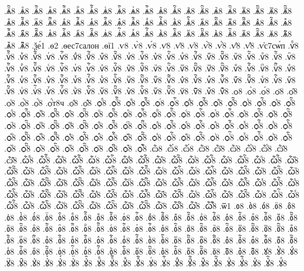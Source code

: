 {.ѧⷩ҇8
.ѧⷪ8
.ѧⷪ҇8
.ѧⷫ8
.ѧⷫ҇8
.ѧⷬ8
.ѧⷬ҇8
.ѧⷭ8
.ѧⷭ҇8
.ѧⷮ8
.ѧⷮ҇8
.ѧⷯ8
.ѧⷯ҇8
.ѧⷰ8
.ѧⷰ҇8
.ѧⷱ8
.ѧⷱ҇8
.ѧⷲ8
.ѧⷲ҇8
.ѧⷳ8
.ѧⷳ҇8
.ѧⷴ8
.ѧⷴ҇8
.ѧⷵ8
.ѧⷵ҇8
.ѧⷶ8
.ѧⷶ҇8
.ѧⷷ8
.ѧⷷ҇8
.ѧⷸ8
.ѧⷸ҇8
.ѧⷹ8
.ѧⷹ҇8
.ѧⷺ8
.ѧⷺ҇8
.ѧⷻ8
.ѧⷻ҇8
.ѧⷼ8
.ѧⷼ҇8
.ѧⷽ8
.ѧⷽ҇8
.ѧⷾ8
.ѧⷾ҇8
.ѧⷿ8
.ѧⷿ҇8
.ѧꙴ8
.ѧꙴ҇8
.ѧꙵ8
.ѧꙵ҇8
.ѧꙶ8
.ѧꙶ҇8
.ѧꙷ8
.ѧꙷ҇8
.ѧꙸ8
.ѧꙸ҇8
.ѧꙹ8
.ѧꙹ҇8
.ѧꙺ8
.ѧꙺ҇8
.ѧꙻ8
.ѧꙻ҇8
.ѧ꙼8
.ѧ꙼҇8
.ѧ꙽8
.ѧ꙽҇8
.ѯе́1
.ѳ2
.ѳес7салон
.ѳї1
.ѵ8
.ѵ̀8
.ѵ́8
.ѵ̈8
.ѵ̑8
.ѵ҆8
.ѵ҆̀8
.ѵ҆́8
.ѵ҆̈8
.ѵ҆̑8
.ѵ҆с7сѡ́п
.ѵⷠ8
.ѵⷠ҇8
.ѵⷡ8
.ѵⷡ҇8
.ѵⷢ8
.ѵⷢ҇8
.ѵⷣ8
.ѵⷣ҇8
.ѵⷤ8
.ѵⷤ҇8
.ѵⷥ8
.ѵⷥ҇8
.ѵⷦ8
.ѵⷦ҇8
.ѵⷧ8
.ѵⷧ҇8
.ѵⷨ8
.ѵⷨ҇8
.ѵⷩ8
.ѵⷩ҇8
.ѵⷪ8
.ѵⷪ҇8
.ѵⷫ8
.ѵⷫ҇8
.ѵⷬ8
.ѵⷬ҇8
.ѵⷭ8
.ѵⷭ҇8
.ѵⷮ8
.ѵⷮ҇8
.ѵⷯ8
.ѵⷯ҇8
.ѵⷰ8
.ѵⷰ҇8
.ѵⷱ8
.ѵⷱ҇8
.ѵⷲ8
.ѵⷲ҇8
.ѵⷳ8
.ѵⷳ҇8
.ѵⷴ8
.ѵⷴ҇8
.ѵⷵ8
.ѵⷵ҇8
.ѵⷶ8
.ѵⷶ҇8
.ѵⷷ8
.ѵⷷ҇8
.ѵⷸ8
.ѵⷸ҇8
.ѵⷹ8
.ѵⷹ҇8
.ѵⷺ8
.ѵⷺ҇8
.ѵⷻ8
.ѵⷻ҇8
.ѵⷼ8
.ѵⷼ҇8
.ѵⷽ8
.ѵⷽ҇8
.ѵⷾ8
.ѵⷾ҇8
.ѵⷿ8
.ѵⷿ҇8
.ѵꙴ8
.ѵꙴ҇8
.ѵꙵ8
.ѵꙵ҇8
.ѵꙶ8
.ѵꙶ҇8
.ѵꙷ8
.ѵꙷ҇8
.ѵꙸ8
.ѵꙸ҇8
.ѵꙹ8
.ѵꙹ҇8
.ѵꙺ8
.ѵꙺ҇8
.ѵꙻ8
.ѵꙻ҇8
.ѵ꙼8
.ѵ꙼҇8
.ѵ꙽8
.ѵ꙽҇8
.ѻ8
.ѻ̀8
.ѻ́8
.ѻ̈8
.ѻ̑8
.ѻ҆8
.ѻ҆̀8
.ѻ҆́8
.ѻ҆́т8ч
.ѻ҆̈8
.ѻ҆̑8
.ѻⷠ8
.ѻⷠ҇8
.ѻⷡ8
.ѻⷡ҇8
.ѻⷢ8
.ѻⷢ҇8
.ѻⷣ8
.ѻⷣ҇8
.ѻⷤ8
.ѻⷤ҇8
.ѻⷥ8
.ѻⷥ҇8
.ѻⷦ8
.ѻⷦ҇8
.ѻⷧ8
.ѻⷧ҇8
.ѻⷨ8
.ѻⷨ҇8
.ѻⷩ8
.ѻⷩ҇8
.ѻⷪ8
.ѻⷪ҇8
.ѻⷫ8
.ѻⷫ҇8
.ѻⷬ8
.ѻⷬ҇8
.ѻⷭ8
.ѻⷭ҇8
.ѻⷮ8
.ѻⷮ҇8
.ѻⷯ8
.ѻⷯ҇8
.ѻⷰ8
.ѻⷰ҇8
.ѻⷱ8
.ѻⷱ҇8
.ѻⷲ8
.ѻⷲ҇8
.ѻⷳ8
.ѻⷳ҇8
.ѻⷴ8
.ѻⷴ҇8
.ѻⷵ8
.ѻⷵ҇8
.ѻⷶ8
.ѻⷶ҇8
.ѻⷷ8
.ѻⷷ҇8
.ѻⷸ8
.ѻⷸ҇8
.ѻⷹ8
.ѻⷹ҇8
.ѻⷺ8
.ѻⷺ҇8
.ѻⷻ8
.ѻⷻ҇8
.ѻⷼ8
.ѻⷼ҇8
.ѻⷽ8
.ѻⷽ҇8
.ѻⷾ8
.ѻⷾ҇8
.ѻⷿ8
.ѻⷿ҇8
.ѻꙴ8
.ѻꙴ҇8
.ѻꙵ8
.ѻꙵ҇8
.ѻꙶ8
.ѻꙶ҇8
.ѻꙷ8
.ѻꙷ҇8
.ѻꙸ8
.ѻꙸ҇8
.ѻꙹ8
.ѻꙹ҇8
.ѻꙺ8
.ѻꙺ҇8
.ѻꙻ8
.ѻꙻ҇8
.ѻ꙼8
.ѻ꙼҇8
.ѻ꙽8
.ѻ꙽҇8
.ѽ8
.ѽ̀8
.ѽ́8
.ѽ̈8
.ѽ̑8
.ѽ҆8
.ѽ҆̀8
.ѽ҆́8
.ѽ҆̈8
.ѽ҆̑8
.ѽⷠ8
.ѽⷠ҇8
.ѽⷡ8
.ѽⷡ҇8
.ѽⷢ8
.ѽⷢ҇8
.ѽⷣ8
.ѽⷣ҇8
.ѽⷤ8
.ѽⷤ҇8
.ѽⷥ8
.ѽⷥ҇8
.ѽⷦ8
.ѽⷦ҇8
.ѽⷧ8
.ѽⷧ҇8
.ѽⷨ8
.ѽⷨ҇8
.ѽⷩ8
.ѽⷩ҇8
.ѽⷪ8
.ѽⷪ҇8
.ѽⷫ8
.ѽⷫ҇8
.ѽⷬ8
.ѽⷬ҇8
.ѽⷭ8
.ѽⷭ҇8
.ѽⷮ8
.ѽⷮ҇8
.ѽⷯ8
.ѽⷯ҇8
.ѽⷰ8
.ѽⷰ҇8
.ѽⷱ8
.ѽⷱ҇8
.ѽⷲ8
.ѽⷲ҇8
.ѽⷳ8
.ѽⷳ҇8
.ѽⷴ8
.ѽⷴ҇8
.ѽⷵ8
.ѽⷵ҇8
.ѽⷶ8
.ѽⷶ҇8
.ѽⷷ8
.ѽⷷ҇8
.ѽⷸ8
.ѽⷸ҇8
.ѽⷹ8
.ѽⷹ҇8
.ѽⷺ8
.ѽⷺ҇8
.ѽⷻ8
.ѽⷻ҇8
.ѽⷼ8
.ѽⷼ҇8
.ѽⷽ8
.ѽⷽ҇8
.ѽⷾ8
.ѽⷾ҇8
.ѽⷿ8
.ѽⷿ҇8
.ѽꙴ8
.ѽꙴ҇8
.ѽꙵ8
.ѽꙵ҇8
.ѽꙶ8
.ѽꙶ҇8
.ѽꙷ8
.ѽꙷ҇8
.ѽꙸ8
.ѽꙸ҇8
.ѽꙹ8
.ѽꙹ҇8
.ѽꙺ8
.ѽꙺ҇8
.ѽꙻ8
.ѽꙻ҇8
.ѽ꙼8
.ѽ꙼҇8
.ѽ꙽8
.ѽ꙽҇8
.ѿ1
.ᲂ8
.ᲂ̀8
.ᲂ́8
.ᲂ̈8
.ᲂ̑8
.ᲂ҆8
.ᲂ҆̀8
.ᲂ҆́8
.ᲂ҆̈8
.ᲂ҆̑8
.ᲂⷠ8
.ᲂⷠ҇8
.ᲂⷡ8
.ᲂⷡ҇8
.ᲂⷢ8
.ᲂⷢ҇8
.ᲂⷣ8
.ᲂⷣ҇8
.ᲂⷤ8
.ᲂⷤ҇8
.ᲂⷥ8
.ᲂⷥ҇8
.ᲂⷦ8
.ᲂⷦ҇8
.ᲂⷧ8
.ᲂⷧ҇8
.ᲂⷨ8
.ᲂⷨ҇8
.ᲂⷩ8
.ᲂⷩ҇8
.ᲂⷪ8
.ᲂⷪ҇8
.ᲂⷫ8
.ᲂⷫ҇8
.ᲂⷬ8
.ᲂⷬ҇8
.ᲂⷭ8
.ᲂⷭ҇8
.ᲂⷮ8
.ᲂⷮ҇8
.ᲂⷯ8
.ᲂⷯ҇8
.ᲂⷰ8
.ᲂⷰ҇8
.ᲂⷱ8
.ᲂⷱ҇8
.ᲂⷲ8
.ᲂⷲ҇8
.ᲂⷳ8
.ᲂⷳ҇8
.ᲂⷴ8
.ᲂⷴ҇8
.ᲂⷵ8
.ᲂⷵ҇8
.ᲂⷶ8
.ᲂⷶ҇8
.ᲂⷷ8
.ᲂⷷ҇8
.ᲂⷸ8
.ᲂⷸ҇8
.ᲂⷹ8
.ᲂⷹ҇8
.ᲂⷺ8
.ᲂⷺ҇8
.ᲂⷻ8
.ᲂⷻ҇8
.ᲂⷼ8
.ᲂⷼ҇8
.ᲂⷽ8
.ᲂⷽ҇8
.ᲂⷾ8
.ᲂⷾ҇8
.ᲂⷿ8
.ᲂⷿ҇8
.ᲂꙴ8
.ᲂꙴ҇8
.ᲂꙵ8
.ᲂꙵ҇8
.ᲂꙶ8
.ᲂꙶ҇8
.ᲂꙷ8
.ᲂꙷ҇8
.ᲂꙸ8
.ᲂꙸ҇8
.ᲂꙹ8
.ᲂꙹ҇8
.ᲂꙺ8
.ᲂꙺ҇8
.ᲂꙻ8
.ᲂꙻ҇8
.ᲂ꙼8
.ᲂ꙼҇8
.ᲂ꙽8
.ᲂ꙽҇8
.ꙋ8
.ꙋ̀8
.ꙋ́8
.ꙋ̈8
.ꙋ̑8
.ꙋ҆8
.ꙋ҆̀8
.ꙋ҆́8
.ꙋ҆̈8
.ꙋ҆̑8
.ꙋⷠ8
.ꙋⷠ҇8
.ꙋⷡ8
.ꙋⷡ҇8
.ꙋⷢ8
.ꙋⷢ҇8
.ꙋⷣ8
.ꙋⷣ҇8
.ꙋⷤ8
.ꙋⷤ҇8
.ꙋⷥ8
.ꙋⷥ҇8
.ꙋⷦ8
.ꙋⷦ҇8
.ꙋⷧ8
}

